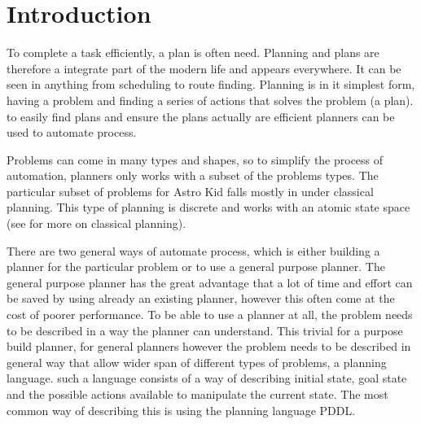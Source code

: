 \chapter{Introduction}	
	

	To complete a task efficiently, a plan is often need. Planning and plans are therefore a integrate part of the modern life and appears everywhere. It can be seen in anything from scheduling to route finding. Planning is in it simplest form, having a problem and finding a series of actions that solves the problem (a plan). to easily find plans and ensure the plans actually are efficient planners can be used to automate process.  
	
	Problems can come in many types and shapes, so to simplify the process of automation, planners only works with a subset of the problems types. The particular subset of problems for Astro Kid falls mostly in under classical planning. This type of planning is discrete and works with an atomic state space (see \cite{russell2014a} for more on classical planning).
	
	

	There are two general ways of automate process, which is either building a planner for the particular problem or to use a general purpose planner. 
	The general purpose planner has the great advantage that a lot of time and effort can be saved by using already an existing planner, however this often come at the cost of poorer performance.
	To be able to use a planner at all, the problem needs to be described in a way the planner can understand. This trivial for a purpose build planner, for general planners however the problem needs to be described in general way that allow wider span of different types of problems, a planning language. such a language consists of a way of describing initial state, goal state and the possible actions available to manipulate the current state. The most common way of describing this is using the planning language PDDL. 
	

%



